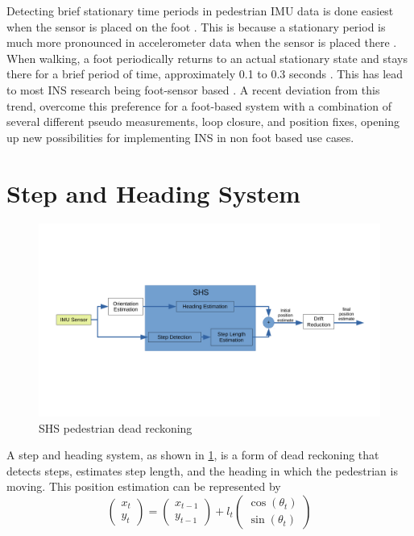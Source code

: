 Detecting brief stationary time periods in pedestrian IMU data is done easiest when the sensor is placed on the foot \cite{Diez2018,Davidson2017}. This is because a stationary period is much more pronounced in accelerometer data when the sensor is placed there \cite{Yu2019,Wu2019}.  When walking, a foot periodically returns to an actual stationary state and stays there for a brief period of time, approximately 0.1 to 0.3 seconds \cite{Ren2016a}. This has lead to most \ac{INS} research being foot-sensor based \cite{Diez2018,Wu2019}. A recent deviation from this trend, \citet{Solin2018a} overcome this preference for a foot-based system with a combination of several different pseudo measurements, loop closure, and position fixes, opening up new possibilities for implementing INS in non foot based use cases.\\

\section{Step and Heading System}
\label{sec:rw-SHS}
\begin{figure}[H]
	\centering
	\includegraphics[trim=40 120 180 80, clip,width=\linewidth]{images/shs_diagram}
	\caption{\ac{SHS} pedestrian dead reckoning}
	\label{fig:shs_diagram}
\end{figure}
A step and heading system, as shown in \cref{fig:shs_diagram}, is a form of dead reckoning that detects steps, estimates step length, and the heading in which the pedestrian is moving. This position estimation can be represented by \cite{MunozDiaz2019}
\begin{equation}
	\label{eq:SHS_dynamic_model}
	\left(\begin{array}{l}
		x_t \\
		y_t
	\end{array}\right) 
	=
	\left(\begin{array}{l}
		x_{t-1} \\
		y_{t-1}
	\end{array}\right) 
	+l_{t} \left(\begin{array}{l}
		\cos \left(\theta_{t}\right) \\
		\sin \left(\theta_{t}\right)
	\end{array}\right)
\end{equation}

